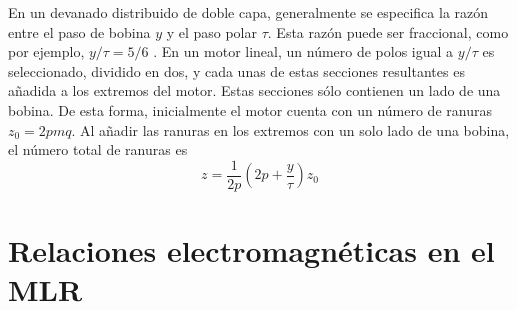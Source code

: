 En un devanado distribuido de doble capa, generalmente se especifica la razón entre el paso de bobina $y$ y el paso polar $\tau$. Esta razón puede ser fraccional, como por ejemplo, $y/\tau = 5/6$ \cite{boldea2010}. En un motor lineal, un número de polos igual a $y/\tau$ es seleccionado, dividido en dos, y cada unas de estas secciones resultantes es añadida a los extremos del motor. Estas secciones sólo contienen un lado de una bobina. De esta forma, inicialmente el motor cuenta con un número de ranuras $z_0 = 2pmq$. Al añadir las ranuras en los extremos con un solo lado de una bobina, el número total de ranuras es
\begin{equation}
z = \frac{1}{2p}
\left(
2p + \frac{y}{\tau}
\right)
z_0
\end{equation}

\section{Relaciones electromagnéticas en el MLR}

